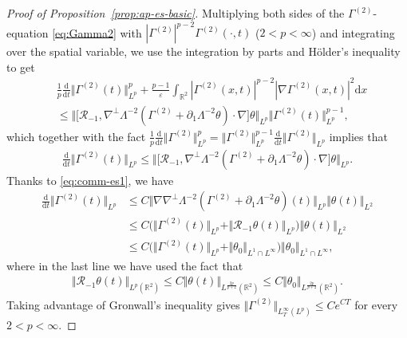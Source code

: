 \documentclass[reqno,11pt,a4paper]{amsart}
\newcommand{\RR}{\ensuremath{\mathcal{R}}}
\newcommand{\dd}{\mathrm{d}}
\begin{document}
\begin{proof}[Proof of Proposition~\ref{prop:ap-es-basic}]
Multiplying both sides of the $\Gamma^{(2)}$-equation \eqref{eq:Gamma2} with $|\Gamma^{(2)}|^{p-2}\Gamma^{(2)}(\cdot,t)$ 
($2<p<\infty$) and integrating over the spatial variable, we use the integration by parts and H\"older's inequality to get
\begin{equation}
\begin{split}
  &\frac{1}{p} \frac{\dd}{\dd t} \Vert \Gamma^{(2)}(t)\Vert _{L^p}^p + \frac{p-1}{\varepsilon} \int_{\mathbb{R}^2} |\Gamma^{(2)}(x,t)|^{p-2}
  |\nabla\Gamma^{(2)}(x,t)|^2 \dd x\\
   &\leq \big\Vert  \big[\mathcal{R}_{-1}, \nabla^{\bot}\Lambda^{-2}(\Gamma^{(2)}+\partial_1\Lambda^{-2}\theta)\cdot \nabla\big] \theta\big\Vert _{L^p} \Vert \Gamma^{(2)}(t)\Vert _{L^p}^{p-1},
\end{split}
\end{equation}
which together with the fact 
$\frac{1}{p} \frac{\dd}{\dd t} \Vert \Gamma^{(2)}\Vert _{L^p}^p=\Vert \Gamma^{(2)}\Vert _{L^p}^{p-1} 
\frac{\dd}{\dd t}\Vert \Gamma^{(2)}\Vert _{L^p}$ 
implies that
\begin{align*}
  \frac{\dd}{\dd t} \Vert \Gamma^{(2)}(t)\Vert _{L^p} \leq \big\Vert \big[\mathcal{R}_{-1}, \nabla^{\bot}\Lambda^{-2}
  (\Gamma^{(2)}+\partial_1\Lambda^{-2}\theta)\cdot \nabla \big] \theta \big\Vert _{L^p} .
\end{align*}
Thanks to \eqref{eq:comm-es1}, we have 
\begin{align}
  \frac{\dd}{\dd t}\Vert \Gamma^{(2)}(t)\Vert _{L^p} %
  & \leq C \Vert \nabla \nabla^{\bot}\Lambda^{-2}(\Gamma^{(2)} 
  + \partial_1\Lambda^{-2}\theta)(t)\Vert _{L^p}\Vert \theta(t)\Vert _{L^2} \nonumber\\
  & \leq C \big(\Vert \Gamma^{(2)}(t)\Vert _{L^p} + \Vert \RR_{-1}\theta(t)\Vert _{L^p} \big)\Vert \theta(t)\Vert _{L^2}\nonumber\\
  & \leq C \big(\Vert \Gamma^{(2)}(t)\Vert _{L^p} + \Vert \theta_0\Vert _{L^1\cap L^\infty}\big) \Vert \theta_0\Vert _{L^1\cap L^\infty},
\end{align}
where in the last line we have used the fact that 
\begin{align}\label{eq:fact-R-1the}
  \Vert \mathcal{R}_{-1}\theta(t)\Vert _{L^p(\mathbb{R}^2)} \leq C \Vert \theta(t)\Vert _{L^{\frac{2p}{p+2}}(\mathbb{R}^2)} 
  \leq C \Vert \theta_0\Vert _{L^{\frac{2p}{p+2}}(\mathbb{R}^2)}.
\end{align}
Taking advantage of Gronwall's inequality gives $\Vert \Gamma^{(2)}\Vert _{L^\infty_T(L^p)} \leq C e^{CT}$ for every $2<p<\infty$. 


\end{proof}
\end{document}
